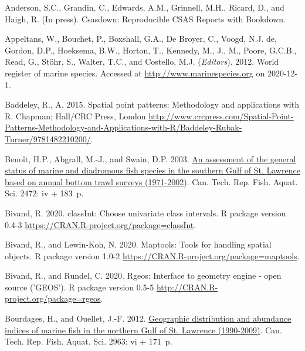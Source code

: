 \documentclass[12pt]{article}\usepackage[]{graphicx}\usepackage[]{color}
\begin{document}
\hypertarget{refs}{}
\begin{CSLReferences}{1}{0}
\leavevmode\hypertarget{ref-R:csasdown}{}%
Anderson, S.C., Grandin, C., Edwards, A.M., Grinnell, M.H., Ricard, D., and Haigh, R. (In press). Csasdown: {R}eproducible {CSAS} {R}eports with {B}ookdown.

\leavevmode\hypertarget{ref-WoRMS}{}%
Appeltans, W., Bouchet, P., Boxshall, G.A., De Broyer, C., Voogd, N.J. de, Gordon, D.P., Hoeksema, B.W., Horton, T., Kennedy, M., J., M., Poore, G.C.B., Read, G., Stöhr, S., Walter, T.C., and Costello, M.J. (\emph{Editors}). 2012. World register of marine species. Accessed at \url{http://www.marinespecies.org} on 2020-12-1.

\leavevmode\hypertarget{ref-R:package:spatstat}{}%
Baddeley, R., A. 2015. Spatial point patterns: Methodology and applications with {R}. Chapman; Hall/CRC Press, London \url{http://www.crcpress.com/Spatial-Point-Patterns-Methodology-and-Applications-with-R/Baddeley-Rubak-Turner/9781482210200/}.

\leavevmode\hypertarget{ref-Benoit:etal:2003:techreport}{}%
Benoît, H.P., Abgrall, M.-J., and Swain, D.P. 2003. \href{http://publications.gc.ca/site/eng/428386/publication.html}{An assessment of the general status of marine and diadromous fish species in the southern {G}ulf of {S}t. {L}awrence based on annual bottom trawl surveys (1971-2002)}. Can. Tech. Rep. Fish. Aquat. Sci. 2472: iv + 183~p.

\leavevmode\hypertarget{ref-R:package:classInt}{}%
Bivand, R. 2020. classInt: Choose univariate class intervals. R package version 0.4-3 \url{https://CRAN.R-project.org/package=classInt}.

\leavevmode\hypertarget{ref-R:package:maptools}{}%
Bivand, R., and Lewin-Koh, N. 2020. Maptools: Tools for handling spatial objects. R package version 1.0-2 \url{https://CRAN.R-project.org/package=maptools}.

\leavevmode\hypertarget{ref-R:package:rgeos}{}%
Bivand, R., and Rundel, C. 2020. Rgeos: Interface to geometry engine - open source ('GEOS'). R package version 0.5-5 \url{http://CRAN.R-project.org/package=rgeos}.

\leavevmode\hypertarget{ref-Bourdages:NGatlas:2012}{}%
Bourdages, H., and Ouellet, J.-F. 2012. \href{http://publications.gc.ca/site/eng/425663/publication.html}{Geographic distribution and abundance indices of marine fish in the northern {G}ulf of {S}t. {L}awrence (1990-2009)}. Can. Tech. Rep. Fish. Aquat. Sci. 2963: vi + 171~p.


\end{CSLReferences}
\end{document}
